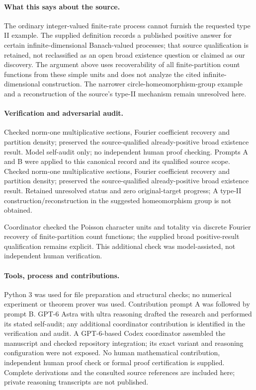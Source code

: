 \documentclass[11pt]{article}
\begin{document}
\paragraph{What this says about the source.} The ordinary integer-valued finite-rate process cannot furnish the requested type II example. The supplied definition records a published positive answer for certain infinite-dimensional Banach-valued processes; that source qualification is retained, not reclassified as an open broad existence question or claimed as our discovery. The argument above uses recoverability of all finite-partition count functions from these simple units and does not analyze the cited infinite-dimensional construction. The narrower circle-homeomorphism-group example and a reconstruction of the source's type-II mechanism remain unresolved here.

\paragraph{Verification and adversarial audit.}
Checked norm-one multiplicative sections, Fourier coefficient recovery and partition density; preserved the source-qualified already-positive broad existence result. Model self-audit only; no independent human proof checking. Prompts A and B were applied to this canonical record and its qualified source scope. Checked norm-one multiplicative sections, Fourier coefficient recovery and partition density; preserved the source-qualified already-positive broad existence result. Retained unresolved status and zero original-target progress; A type-II construction/reconstruction in the suggested homeomorphism group is not obtained.

Coordinator checked the Poisson character units and totality via discrete Fourier recovery of finite-partition count functions; the supplied broad positive-result qualification remains explicit. This additional check was model-assisted, not independent human verification.

\paragraph{Tools, process and contributions.}
Python 3 was used for file preparation and structural checks; no numerical experiment or theorem prover was used. Contribution prompt A was followed by prompt B. GPT-6 Astra with ultra reasoning drafted the research and performed its stated self-audit; any additional coordinator contribution is identified in the verification and audit. A GPT-6-based Codex coordinator assembled the manuscript and checked repository integration; its exact variant and reasoning configuration were not exposed. No human mathematical contribution, independent human proof check or formal proof certification is supplied. Complete derivations and the consulted source references are included here; private reasoning transcripts are not published.
\end{document}
